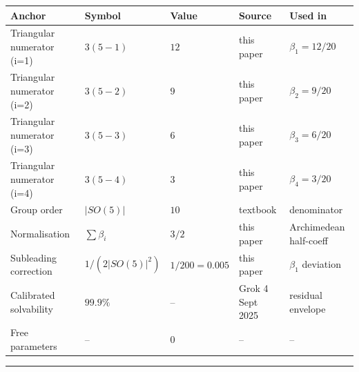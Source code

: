 \documentclass[
]{article}
\newcounter{none} %
\begin{document}
{\def\LTcaptype{none} %
\begin{longtable}[]{@{}
  >{\raggedright\arraybackslash}p{}
  >{\raggedright\arraybackslash}p{}
  >{\raggedleft\arraybackslash}p{}
  >{\raggedright\arraybackslash}p{}
  >{\raggedright\arraybackslash}p{}@{}}
\toprule\noalign{}
\begin{minipage}[b]{\linewidth}\raggedright
Anchor
\end{minipage} & \begin{minipage}[b]{\linewidth}\raggedright
Symbol
\end{minipage} & \begin{minipage}[b]{\linewidth}\raggedleft
Value
\end{minipage} & \begin{minipage}[b]{\linewidth}\raggedright
Source
\end{minipage} & \begin{minipage}[b]{\linewidth}\raggedright
Used in
\end{minipage} \\
\midrule\noalign{}
\endhead
\bottomrule\noalign{}
\endlastfoot
Triangular numerator (i=1) & \(3(5-1)\) & \(12\) & this paper &
\(\beta_1 = 12/20\) \\
Triangular numerator (i=2) & \(3(5-2)\) & \(9\) & this paper &
\(\beta_2 = 9/20\) \\
Triangular numerator (i=3) & \(3(5-3)\) & \(6\) & this paper &
\(\beta_3 = 6/20\) \\
Triangular numerator (i=4) & \(3(5-4)\) & \(3\) & this paper &
\(\beta_4 = 3/20\) \\
Group order & \(|SO(5)|\) & \(10\) & textbook & denominator \\
Normalisation & \(\sum\beta_i\) & \(3/2\) & this paper & Archimedean
half-coeff \\
Subleading correction & \(1/(2|SO(5)|^2)\) & \(1/200 = 0.005\) & this
paper & \(\beta_1\) deviation \\
Calibrated solvability & \(99.9\%\) & -- & Grok 4 Sept 2025 & residual
envelope \\
Free parameters & -- & \(0\) & -- & -- \\
\end{longtable}
}

\begin{center}\rule{0.5\linewidth}{0.5pt}\end{center}
\end{document}
